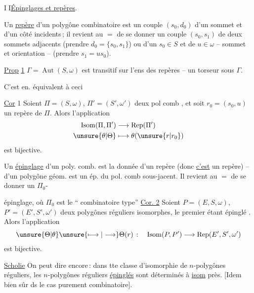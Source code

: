 \textcircled{II}\quad\uline{Épinglages et repères}.

Un \uline{repère} d'un polygône combinatoire est
un couple $(s_0,d_0)$ d'un sommet et d'un côté incidents\,; il revient au $=$ de
se donner un couple $(s_0,s_1)$ de deux
sommets adjacents  (prendre
$d_0=\{s_0,s_1\}$) ou d'un $s_0\in S$ et de $u\in\omega$
-- sommet et orientation -- (prendre $s_1=us_0$).

\uline{Prop} \uline{1} $\Gamma=\operatorname{Aut}(S,\omega)$ est  transitif sur l'ens des repères --   un torseur sous $\Gamma$.

C'est en. équivalent à ceci

\uline{Cor} 1 Soient $\Pi=(S,\omega)$, $\Pi'=(S',\omega')$ deux  pol
comb , et soit $r_0=(s_0,u)$ un repère de
$\Pi$. Alors l'application
\[
\begin{aligned}
\operatorname{Isom}(\Pi,\Pi')&\longrightarrow\operatorname{Rep}(\Pi')\\
\unsure{\theta|\Theta}&\longmapsto\theta(\unsure{r|r_0})
\end{aligned}
\]
est bijective. \unsure{$\vert$}

Un \uline{épinglage} d'un poly. comb. est
la donnée d'un repère (donc \uline{c'est} un
repère) --   d'un polygône géom.
est un ép. du pol. comb sous-jacent.
Il revient au $=$ de  se donner un $\Pi_0$-

épinglage, où $\Pi_0$ est le `` combinatoire type''
\uline{Cor. 2} Soient $P=(E,S,\omega)$, $P'=(E',S',\omega')$ deux
polygônes réguliers isomorphes,  le
premier étant épinglé . Alors l'application
\[
\unsure{\Theta|\theta}\unsure{\longmapsto|\longrightarrow}\Theta(r)\,:\quad \operatorname{Isom}(P,P')\longrightarrow\operatorname{Rep}(E',S',\omega')
\]
est bijective.

\uline{Scholie} On peut dire encore\,: dans tte
classe d'isomorphie de $n$-polygônes
réguliers, les $n$-polygônes réguliers \uline{épinglés}
sont déterminés à \uline{isom}  près.
[Idem bien sûr ds le cas purement
combinatoire]. 

